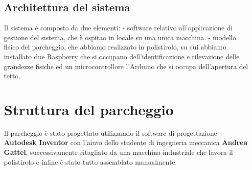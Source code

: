 \documentclass[a4paper,11pt]{report}
\begin{document}
\subsection{Architettura del sistema}
Il sistema è composto da due elementi: \newline
- software relativo all'applicazione di gestione del sistema, che è ospitao in locale su una unica macchina. \newline
- modello fisico del parcheggio, che abbiamo realizzato in polistirolo, su cui abbiamo installato due Raspberry che si occupano dell'identificazione e rilevazione delle grandezze fisiche ed un microcontrollore l'Arduino che si occupa dell'apertura del tetto.

\section{Struttura del parcheggio}
Il parcheggio è stato progettato utilizzando il software di progettazione \textbf{Autodesk Inventor} con l'aiuto dello studente di ingegneria meccanica \textbf{Andrea Gattel}, successivamente ritagliato da una macchina industriale che lavora il polistirolo e infine è stato tutto assemblato manualmente.
\end{document}
